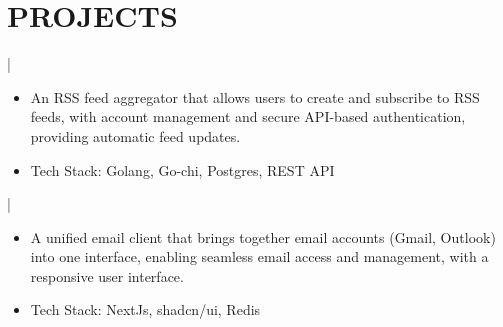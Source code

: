 \documentclass[]{resume}
\begin{document}
\section{PROJECTS}
 | \href{https://github.com/saswatax/rss-aggregator}{\faGithub}
\begin{itemize}
  \item An RSS feed aggregator that allows users to create and subscribe to RSS feeds, with account management and secure API-based authentication, providing automatic feed updates.
  \item Tech Stack: Golang, Go-chi, Postgres, REST API
\end{itemize}
 | \href{https://github.com/saswatax/email-client}{\faGithub}
\begin{itemize}
  \item A unified email client that brings together email accounts (Gmail, Outlook) into one interface, enabling seamless email access and management, with a responsive user interface.
  \item Tech Stack: NextJs, shadcn/ui, Redis
\end{itemize}
\end{document}
